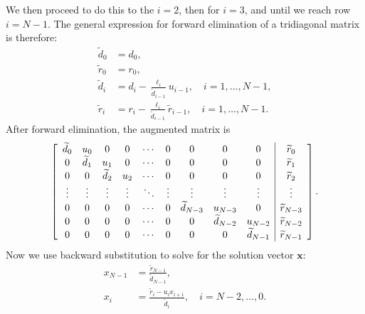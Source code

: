 We then proceed to do this to the $i = 2$, then for $i = 3$, and until we reach row $i = N-1$. The general expression for forward elimination of a tridiagonal matrix is therefore:
\begin{subequations}
\begin{align}
  \widetilde{d}_0 &= d_0, \\
  \widetilde{r}_0 &= r_0, \\
  \widetilde{d}_i &= d_i - \frac{\ell_i}{\widetilde{d}_{i-1}} u_{i-1}, \quad i = 1, \ldots, N-1, \\
  \widetilde{r}_i &= r_i - \frac{\ell_i}{\widetilde{d}_{i-1}} \widetilde{r}_{i-1}, \quad i = 1, \ldots, N-1.
\end{align}
\end{subequations}
After forward elimination, the augmented matrix is
\begin{align}
  \left[ \begin{array}{c c c c c c c c c | c} 
  \widetilde{d}_{0}    & u_{0}    & 0      & 0      & \cdots & 0          & 0          & 0        & 0       & \widetilde{r}_0	  \\
  0		   & \widetilde{d}_{1}    & u_{1}  & 0      & \cdots & 0          & 0          & 0        & 0       & \widetilde{r}_1	  \\
  0        & 0 & \widetilde{d}_{2}  & u_{2}  & \cdots & 0          & 0          & 0        & 0       		& \widetilde{r}_2	  \\
  \vdots   & \vdots   & \vdots & \vdots & \ddots & \vdots     & \vdots     & \vdots   & \vdots  & \vdots  \\
  0        & 0        & 0      & 0      & \cdots & 0 & \widetilde{d}_{N-3}    & u_{N-3}  & 0       & \widetilde{r}_{N-3} \\
  0        & 0        & 0      & 0      & \cdots & 0		  & 0 & \widetilde{d}_{N-2}  & u_{N-2} & \widetilde{r}_{N-2} \\ 
  0        & 0        & 0      & 0      & \cdots & 0          & 0          & 0 & \widetilde{d}_{N-1}   & \widetilde{r}_{N-1}     \\ 
  \end{array} \right] .  \nonumber
\end{align}
Now we use backward substitution to solve for the solution vector $\mathbf{x}$:
\begin{subequations}
\begin{align}
  x_{N-1} &= \frac{\widetilde{r}_{N-1}}{\widetilde{d}_{N-1}}, \\
  x_i &= \frac{\widetilde{r}_i - u_i x_{i+1} }{\widetilde{d}_i}, \quad i = N-2, \ldots, 0.
\end{align}
\end{subequations}

